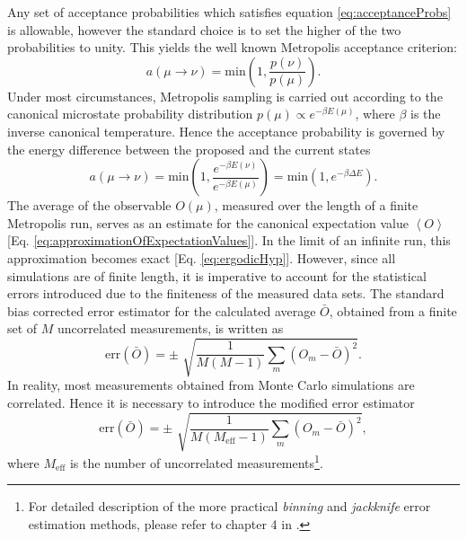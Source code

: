 \documentclass[12pt]{report}
\begin{document}
Any set of acceptance probabilities which satisfies equation \ref{eq:acceptanceProbs} is allowable, however the standard choice is to set the higher of the two probabilities to unity. This yields the well known Metropolis acceptance criterion:
%
\begin{equation}
\label{eq:MetropolisCriterion}
a\left(\mu \rightarrow \nu\right) = \mathrm{min}\left(1,\frac{p\left(\nu\right)}{p\left(\mu\right)} \right).
\end{equation}
% 
Under most circumstances, Metropolis sampling is carried out according to the canonical microstate probability distribution $p(\mu) \propto e^{-\beta E(\mu)}$, where $\beta$ is the inverse canonical temperature. Hence the acceptance probability is governed by the energy difference between the proposed and the current states
%
\begin{equation}
\label{eq:MetropolisCriterion}
a\left(\mu \rightarrow \nu\right) = \mathrm{min}\left(1,\frac{e^{-\beta E(\nu)}}{e^{-\beta E(\mu)}} \right) = \mathrm{min}\left(1,e^{-\beta \Delta E} \right).
\end{equation}
%
The average of the observable $O(\mu)$, measured over the length of a finite Metropolis run, serves as an estimate for the canonical expectation value $\left\langle O \right\rangle$ [Eq.\,\,\ref{eq:approximationOfExpectationValues}]. 
In the limit of an infinite run, this approximation becomes exact [Eq.\,\,\ref{eq:ergodicHyp}]. However, since all simulations are of finite length, it is imperative to account for the statistical errors introduced due to the finiteness of the measured data sets. The standard bias corrected error estimator for the calculated average $\bar{O}$, obtained from a finite set of $M$ uncorrelated measurements, is written as
%
\begin{equation}
\mathrm{err}(\bar{O}) = \pm \,\,\sqrt{\frac{1}{M(M-1)} \sum_{m} (O_{m} - \bar{O})^{2}}.
\end{equation}
%
In reality, most measurements obtained from Monte Carlo simulations are correlated. Hence it is necessary to introduce the modified error estimator
%
\begin{equation}
\mathrm{err}(\bar{O}) = \pm \,\,\sqrt{\frac{1}{M(M_{\mathrm{eff}}-1)} \sum_{m} (O_{m} - \bar{O})^{2}},
\end{equation}
%
where $M_{\mathrm{eff}}$ is the number of uncorrelated measurements\footnote{For detailed description of the more practical \textit{binning} and \textit{jackknife} error estimation methods, please refer to chapter 4 in \cite{Bachmann2014}.}.
\end{document}
